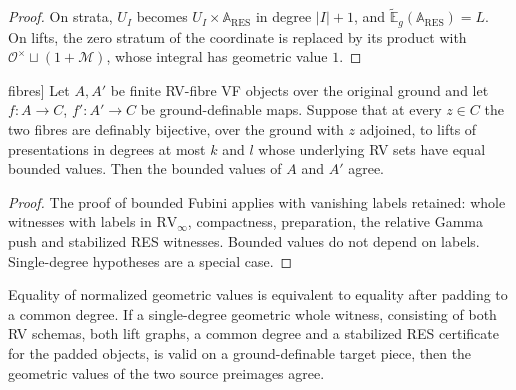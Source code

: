 \begin{proof}
On strata, $U_I$ becomes $U_I\times\mathbb A_{\mathrm{RES}}$ in degree $|I|+1$, and $\widetilde{\mathbb E}_g(\mathbb A_{\mathrm{RES}})=L$. On lifts, the zero stratum of the coordinate is replaced by its product with $\mathcal O^\times\sqcup(1+\mathcal M)$, whose integral has geometric value $1$.
\end{proof}

\begin{theorem}[Bounded Fubini with RV[*] fibres]
\label{weak-bounded}
\leanok
{}
Let $A,A'$ be finite RV-fibre VF objects over the original ground and let $f:A\to C$, $f':A'\to C$ be ground-definable maps. Suppose that at every $z\in C$ the two fibres are definably bijective, over the ground with $z$ adjoined, to lifts of presentations in degrees at most $k$ and $l$ whose underlying RV sets have equal bounded values. Then the bounded values of $A$ and $A'$ agree.
\end{theorem}

\begin{proof}
The proof of bounded Fubini applies with vanishing labels retained: whole witnesses with labels in $\mathrm{RV}_\infty$, compactness, preparation, the relative Gamma push and stabilized RES witnesses. Bounded values do not depend on labels. Single-degree hypotheses are a special case.
\end{proof}

\begin{lemma}
\label{geometric-fixed}
\leanok
{}
Equality of normalized geometric values is equivalent to equality after padding to a common degree. If a single-degree geometric whole witness, consisting of both RV schemas, both lift graphs, a common degree and a stabilized RES certificate for the padded objects, is valid on a ground-definable target piece, then the geometric values of the two source preimages agree.
\end{lemma}

